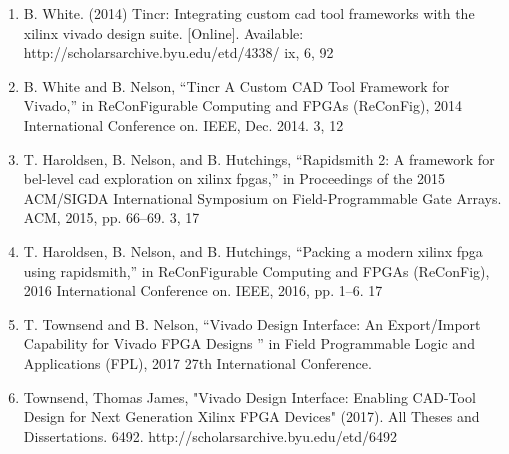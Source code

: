 \begin{enumerate}
  \item B. White. (2014) Tincr: Integrating custom cad tool frameworks with the
  xilinx vivado design suite. [Online]. Available:
  http://scholarsarchive.byu.edu/etd/4338/ ix, 6, 92
  
  \item B. White and B. Nelson, “Tincr A Custom CAD Tool Framework for Vivado,”
  in ReConFigurable Computing and FPGAs (ReConFig), 2014 International
  Conference on. IEEE, Dec. 2014. 3, 12 
   
  \item T. Haroldsen, B. Nelson, and B. Hutchings, “Rapidsmith 2: A framework
  for bel-level cad exploration on xilinx fpgas,” in Proceedings of the 2015
  ACM/SIGDA International Symposium on Field-Programmable Gate Arrays. ACM,
  2015, pp. 66–69. 3, 17
  
  \item  T. Haroldsen, B. Nelson, and B. Hutchings, “Packing a modern xilinx
  fpga using rapidsmith,” in ReConFigurable Computing and FPGAs (ReConFig),
  2016 International Conference on. IEEE, 2016, pp. 1–6. 17
  
  \item T. Townsend and B. Nelson, “Vivado Design Interface: An Export/Import
  Capability for Vivado FPGA Designs ” in Field Programmable Logic and
  Applications (FPL), 2017 27th International Conference.
  
  \item Townsend, Thomas James, "Vivado Design Interface: Enabling CAD-Tool
  Design for Next Generation Xilinx FPGA Devices" (2017). All Theses and
  Dissertations. 6492. http://scholarsarchive.byu.edu/etd/6492 
\end{enumerate}


